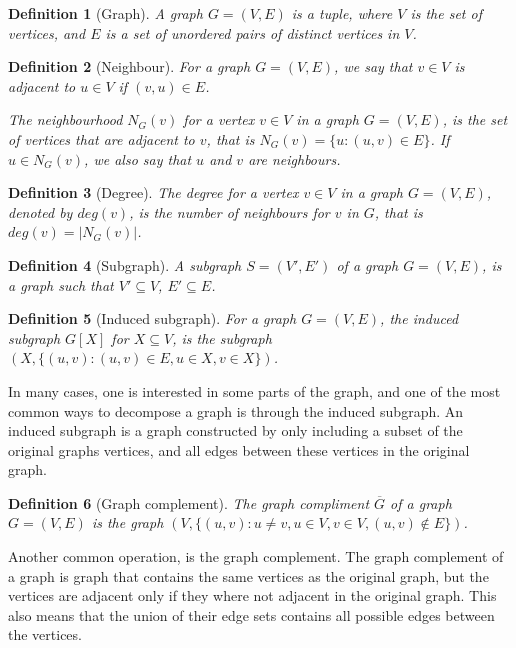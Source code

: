 \documentclass[a4paper]{article}
\newtheorem{definition}{Definition}[section]
\begin{document}
\begin{definition}[Graph]
    A graph $G = (V,E)$ is a tuple, where $V$ is the set of vertices, and $E$ is
    a set of unordered pairs of distinct vertices in $V$.
\end{definition}
\begin{definition}[Neighbour]
    For a graph $G = (V,E)$, we say that $v \in V$ is adjacent to 
    $u \in V$ if $(v,u) \in E$. 

    The neighbourhood $N_G(v)$ for a vertex $v \in V$ in a graph $G = (V,E)$,
    is the set of vertices that are adjacent to $v$, that is 
    $N_G(v) = \{u : (u,v) \in E \}$. If $u \in N_G(v)$, we also say
    that $u$ and $v$ are neighbours.
\end{definition}
\begin{definition}[Degree]
    The degree for a vertex $v \in V$ in a graph $G = (V,E)$, denoted by 
    $deg(v)$, is the number of neighbours for $v$ in $G$, that is 
    $deg(v) = |N_G(v)|$.
\end{definition}


\begin{definition}[Subgraph]
    A subgraph $S = (V',E')$ of a graph $G = (V,E)$, is a graph such that
    $V' \subseteq V$, $E' \subseteq E$.
\end{definition}

\begin{definition}[Induced subgraph]
    For a graph $G = (V,E)$, the induced subgraph $G[X]$ for $X \subseteq V$, is
    the subgraph $(X,\{(u,v) : (u,v) \in E, u \in X,v \in X\})$. 
\end{definition}

In many cases, one is interested in some parts of the graph, and one of the
most common ways to decompose a graph is through the induced subgraph. An induced
subgraph is a graph constructed by only including a subset of the original
graphs vertices, and all edges between these vertices in the original graph.

\begin{definition}[Graph complement]
    The graph compliment $\overline{G}$ of a graph $G = (V,E)$ is the graph 
    $(V,\{ (u,v) : u \neq v, u \in V,v \in V, (u,v) \notin E \})$.
\end{definition}

Another common operation, is the graph complement. The graph complement of a
graph is graph that contains the same vertices as the original graph, but the
vertices are adjacent only if they where not adjacent in the original graph.
This also means that the union of their edge sets contains all possible edges
between the vertices.
\end{document}
